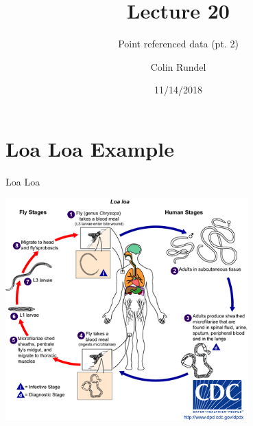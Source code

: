 \documentclass[11pt,ignorenonframetext,]{beamer}
\title{Lecture 20}
\subtitle{Point referenced data (pt. 2)}
\author{Colin Rundel}
\date{11/14/2018}
\begin{document}
\frame{\titlepage}

\hypertarget{loa-loa-example}{%
\section{Loa Loa Example}\label{loa-loa-example}}

\begin{frame}{Loa Loa}
\protect\hypertarget{loa-loa}{}

\begin{center}\includegraphics[width=0.7\textwidth]{figs/loa_loa_LifeCycle} \end{center}

\end{frame}
\end{document}
